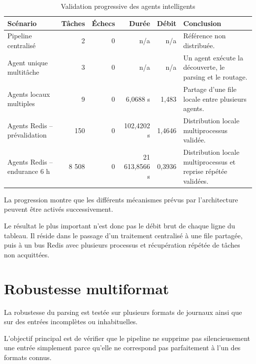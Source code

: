 \begin{table}[H]
\centering
\caption{Validation progressive des agents intelligents}
\label{tab:intelligent-agents-ablation}
\scriptsize

\begin{tabularx}{\textwidth}{p{3.2cm}rrrrX}
\toprule

\textbf{Scénario} &
\textbf{Tâches} &
\textbf{Échecs} &
\textbf{Durée} &
\textbf{Débit} &
\textbf{Conclusion}
\tabularnewline

\midrule

Pipeline centralisé &
2 &
0 &
n/a &
n/a &
Référence non distribuée.
\tabularnewline

Agent unique multitâche &
3 &
0 &
n/a &
n/a &
Un agent exécute la découverte, le parsing et le routage.
\tabularnewline

Agents locaux multiples &
9 &
0 &
6,0688 s &
1,483 &
Partage d'une file locale entre plusieurs agents.
\tabularnewline

Agents Redis -- prévalidation &
150 &
0 &
102,4202 s &
1,4646 &
Distribution locale multiprocessus validée.
\tabularnewline

Agents Redis -- endurance 6 h &
8 508 &
0 &
21 613,8566 s &
0,3936 &
Distribution locale multiprocessus et reprise répétée validées.
\tabularnewline

\bottomrule
\end{tabularx}
\end{table}

La progression montre que les différents mécanismes prévus par l'architecture peuvent être activés successivement.

Le résultat le plus important n'est donc pas le débit brut de chaque ligne du tableau. Il réside dans le passage d'un traitement centralisé à une file partagée, puis à un bus Redis avec plusieurs processus et récupération répétée de tâches non acquittées.

\section{Robustesse multiformat}

La robustesse du parsing est testée sur plusieurs formats de journaux ainsi que sur des entrées incomplètes ou inhabituelles.

L'objectif principal est de vérifier que le pipeline ne supprime pas silencieusement une entrée simplement parce qu'elle ne correspond pas parfaitement à l'un des formats connus.


